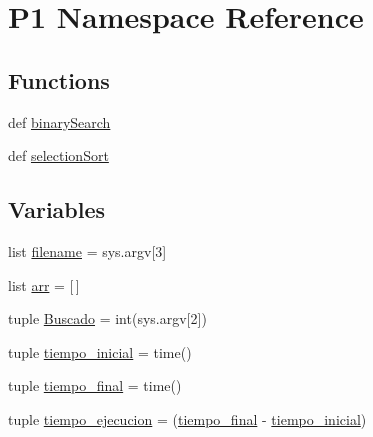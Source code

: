 \hypertarget{namespace_p1}{\section{P1 Namespace Reference}
\label{namespace_p1}
}
\subsection*{Functions}
\begin{DoxyCompactItemize}
\item 
def \hyperlink{namespace_p1_a90db0c73cd0de0a06064c792cd5b273d}{binary\-Search}
\item 
def \hyperlink{namespace_p1_af91c8b389e958fcd8fbf3c0f92bb5526}{selection\-Sort}
\end{DoxyCompactItemize}
\subsection*{Variables}
\begin{DoxyCompactItemize}
\item 
list \hyperlink{namespace_p1_afa130a12e0569461754de8108d62db4f}{filename} = sys.\-argv\mbox{[}3\mbox{]}
\item 
list \hyperlink{namespace_p1_a7f2505b01fc75fffebf9bce9b2a1a8ac}{arr} = \mbox{[}$\,$\mbox{]}
\item 
tuple \hyperlink{namespace_p1_a543c41346e642d3a17a60d4bfcafa7b6}{Buscado} = int(sys.\-argv\mbox{[}2\mbox{]})
\item 
tuple \hyperlink{namespace_p1_a91d519a1fb95100fea7a63aaac72447c}{tiempo\-\_\-inicial} = time()
\item 
tuple \hyperlink{namespace_p1_a422dc409623cdce42d5190c00f59d2df}{tiempo\-\_\-final} = time()
\item 
tuple \hyperlink{namespace_p1_a4f8c0fcce1da06bd45a4b590ecf968e4}{tiempo\-\_\-ejecucion} = (\hyperlink{namespace_p1_a422dc409623cdce42d5190c00f59d2df}{tiempo\-\_\-final} -\/ \hyperlink{namespace_p1_a91d519a1fb95100fea7a63aaac72447c}{tiempo\-\_\-inicial})
\end{DoxyCompactItemize}


